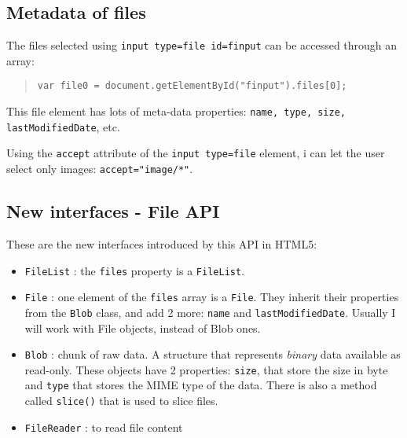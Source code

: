 \documentclass[a4paper,11pt]{book}
\begin{document}
\subsection{Metadata of files}
The files selected using \texttt{input type=file id=finput} can be accessed through
an array:
\begin{verse}
\begin{verbatim}
var file0 = document.getElementById("finput").files[0];
\end{verbatim}
\end{verse}
This file element has lots of meta-data properties:
\texttt{name, type, size, lastModifiedDate}, etc.

Using the \texttt{accept} attribute of the \texttt{input type=file} element,
i can let the user select only images: \texttt{accept="image/*"}.

\subsection{New interfaces - File API}
These are the new interfaces introduced by this API in HTML5:
\begin{itemize}
\item \texttt{FileList} : the \texttt{files} property is a \texttt{FileList}.
\item \texttt{File} : one element of the \texttt{files} array is a \texttt{File}.
They inherit their properties from the \texttt{Blob} class, and add 2 more:
\texttt{name} and \texttt{lastModifiedDate}. Usually I will work with File objects,
instead of Blob ones.
\item \texttt{Blob} : chunk of raw data. A structure that represents \textit{binary}
data
available as read-only. These objects have 2 properties: \texttt{size}, that
store the size in byte and \texttt{type} that stores the MIME type of the data.
There is also a method called \texttt{slice()} that is used to slice files.
\item \texttt{FileReader} : to read file content
\end{itemize}
\end{document}
